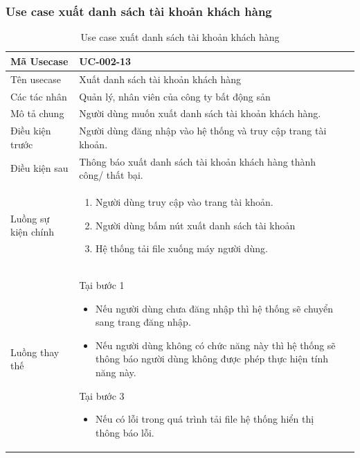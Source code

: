 \documentclass[12pt,a4paper]{article}
\begin{document}
    \subsubsection*{Use case xuất danh sách tài khoản khách hàng}
    \begin{table}[H]
        \centering
        \begin{tabular}{|p{3.5cm}|p{11.5cm}|c|}
            \hline
            Mã Usecase      & UC-002-13                                                           \\
            \hline
            Tên usecase     & Xuất danh sách tài khoản khách hàng                                 \\
            \hline
            Các tác nhân    & Quản lý, nhân viên của công ty bất động sản                         \\
            \hline
            Mô tả chung     & Người dùng muốn xuất danh sách tài khoản khách hàng.                \\
            \hline
            Điều kiện trước & Người dùng đăng nhập vào hệ thống và truy cập trang tài khoản.      \\
            \hline
            Điều kiện sau   & Thông báo xuất danh sách tài khoản khách hàng thành công/ thất bại. \\
            \hline
            Luồng sự kiện chính & \vspace{-.8cm}\begin{enumerate}
                                                    \item Người dùng truy cập vào trang tài khoản.
                                                    \item Người dùng bấm nút xuất danh sách tài khoản
                                                    \item Hệ thống tải file xuống máy người dùng.
            \end{enumerate}
            \\
            \hline
            Luồng thay thế & Tại bước 1\newline
            \vspace{-.8cm}\begin{itemize}
                              \item Nếu người dùng chưa đăng nhập thì hệ thống sẽ chuyển sang trang đăng nhập.
                              \item Nếu người dùng không có chức năng này thì hệ thống sẽ thông báo người dùng không được phép thực hiện tính năng này.
            \end{itemize}
            Tại bước 3\newline
            \vspace{-.8cm}\begin{itemize}
                              \item Nếu có lỗi trong quá trình tải file hệ thống hiển thị thông báo lỗi.
            \end{itemize}
            \\ \hline
        \end{tabular}
        \caption{Use case xuất danh sách tài khoản khách hàng}
    \end{table}
\end{document}
